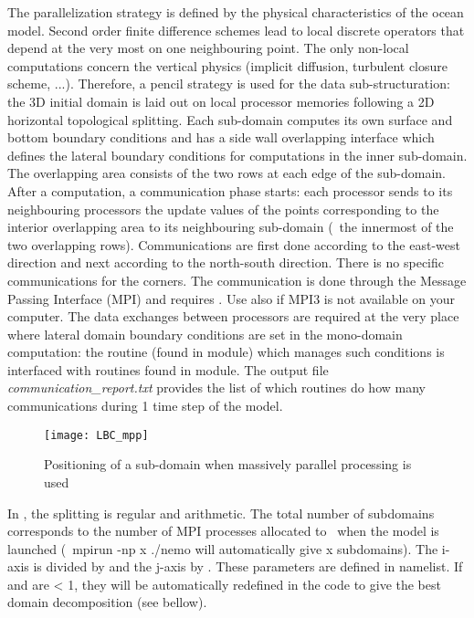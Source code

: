 \documentclass[../main/NEMO_manual]{subfiles}
\begin{document}
The parallelization strategy is defined by the physical characteristics of the ocean model.
Second order finite difference schemes lead to local discrete operators that
depend at the very most on one neighbouring point.
The only non-local computations concern the vertical physics
(implicit diffusion, turbulent closure scheme, ...).
Therefore, a pencil strategy is used for the data sub-structuration:
the 3D initial domain is laid out on local processor memories following a 2D horizontal topological splitting.
Each sub-domain computes its own surface and bottom boundary conditions and
has a side wall overlapping interface which defines the lateral boundary conditions for
computations in the inner sub-domain.
The overlapping area consists of the two rows at each edge of the sub-domain.
After a computation, a communication phase starts:
each processor sends to its neighbouring processors the update values of the points corresponding to
the interior overlapping area to its neighbouring sub-domain (\ie\ the innermost of the two overlapping rows).
Communications are first done according to the east-west direction and next according to the north-south direction.
There is no specific communications for the corners.
The communication is done through the Message Passing Interface (MPI) and requires .
Use also  if MPI3 is not available on your computer.
The data exchanges between processors are required at the very place where
lateral domain boundary conditions are set in the mono-domain computation:
the  routine (found in  module) which manages such conditions is interfaced with
routines found in  module.
The output file \textit{communication\_report.txt} provides the list of which routines do how
many communications during 1 time step of the model.\\

\begin{figure}[!t]
  \centering
  \texttt{[image: LBC\_mpp]}
  \caption{Positioning of a sub-domain when massively parallel processing is used}
  \label{fig:LBC_mpp}
\end{figure}

In \NEMO, the splitting is regular and arithmetic.
The total number of subdomains corresponds to the number of MPI processes allocated to \NEMO\ when the model is launched
(\ie\ mpirun -np x ./nemo will automatically give x subdomains).
The i-axis is divided by  and the j-axis by .
These parameters are defined in  namelist.
If  and  are < 1, they will be automatically redefined in the code to give the best domain decomposition
(see bellow).
\end{document}
